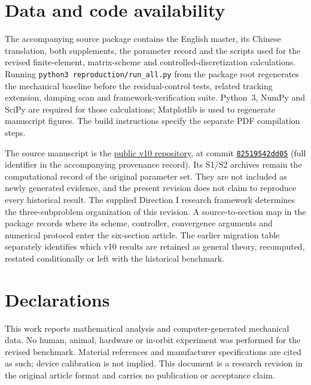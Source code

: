 \section*{Data and code availability}
The accompanying source package contains the English master, its Chinese translation, both supplements, the parameter record and the scripts used for the revised finite-element, matrix-scheme and controlled-discretization calculations. Running \texttt{python3 reproduction/run\_all.py} from the package root regenerates the mechanical baseline before the residual-control tests, related tracking extension, damping scan and framework-verification suite. Python~3, NumPy and SciPy are required for those calculations; Matplotlib is used to regenerate manuscript figures. The build instructions specify the separate PDF compilation steps.

The source manuscript is the \href{https://github.com/mop74720-commits/IJRR_CHNN_KAM_v10_20261007}{public v10 repository}, at commit \href{https://github.com/mop74720-commits/IJRR_CHNN_KAM_v10_20261007/tree/82519542dd057e8fbd6d6879ef33217761e8cbbb}{\texttt{82519542dd05}} (full identifier in the accompanying provenance record). Its S1/S2 archives remain the computational record of the original parameter set. They are not included as newly generated evidence, and the present revision does not claim to reproduce every historical result. The supplied Direction I research framework determines the three-subproblem organization of this revision. A source-to-section map in the package records where its scheme, controller, convergence arguments and numerical protocol enter the six-section article. The earlier migration table separately identifies which v10 results are retained as general theory, recomputed, restated conditionally or left with the historical benchmark.

\section*{Declarations}
This work reports mathematical analysis and computer-generated mechanical data. No human, animal, hardware or in-orbit experiment was performed for the revised benchmark. Material references and manufacturer specifications are cited as such; device calibration is not implied. This document is a research revision in the original article format and carries no publication or acceptance claim.
